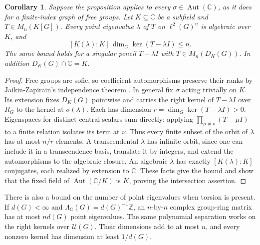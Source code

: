 \documentclass[11pt,a4paper,reqno]{amsart}
\numberwithin{equation}{section}
\newtheorem{corollary}[theorem]{Corollary}
\theoremstyle{remark}
\newcommand{\C}{\mathbb C}
\newcommand{\Z}{\mathbb Z}
\newcommand{\U}{\mathcal U}
\newcommand{\Aut}{\operatorname{Aut}}
\begin{document}
\begin{corollary}\label{cor:sac-point-spectrum}
Suppose the proposition applies to every \(\sigma\in\Aut(\C)\), as it does for a finite-index graph of free groups. Let \(K\subseteq\C\) be a subfield and \(T\in M_n(K[G])\). Every point eigenvalue \(\lambda\) of \(T\) on \(\ell^2(G)^n\) is algebraic over \(K\), and
\[
          [K(\lambda):K]\,\dim_G\ker(T-\lambda I)\le n.
\]
The same bound holds for a singular pencil \(T-\lambda I\) with \(T\in M_n(D_K(G))\). In addition \(D_K(G)\cap\C=K\).
\end{corollary}
\begin{proof}
Free groups are sofic, so coefficient automorphisms preserve their ranks by Jaikin-Zapirain's independence theorem \cite[Corollary~1.7]{Jaikin}. In general fix \(\sigma\) acting trivially on \(K\). Its extension fixes \(D_K(G)\) pointwise and carries the right kernel of \(T-\lambda I\) over \(R_G\) to the kernel at \(\sigma(\lambda)\). Each has dimension \(r=\dim_G\ker(T-\lambda I)>0\). Eigenspaces for distinct central scalars sum directly: applying \(\prod_{\mu\ne\nu}(T-\mu I)\) to a finite relation isolates its term at \(\nu\). Thus every finite subset of the orbit of \(\lambda\) has at most \(n/r\) elements. A transcendental \(\lambda\) has infinite orbit, since one can include it in a transcendence basis, translate it by integers, and extend the automorphisms to the algebraic closure. An algebraic \(\lambda\) has exactly \([K(\lambda):K]\) conjugates, each realized by extension to \(\C\). These facts give the bound and show that the fixed field of \(\Aut(\C/K)\) is \(K\), proving the intersection assertion.
\end{proof}

There is also a bound on the number of point eigenvalues when torsion is present. If \(d(G)<\infty\) and \(\Lambda_{\C}(G)=d(G)^{-1}\Z\), an \(n\)-by-\(n\) complex group-ring matrix has at most \(nd(G)\) point eigenvalues. The same polynomial separation works on the right kernels over \(\U(G)\). Their dimensions add to at most \(n\), and every nonzero kernel has dimension at least \(1/d(G)\).
\end{document}
